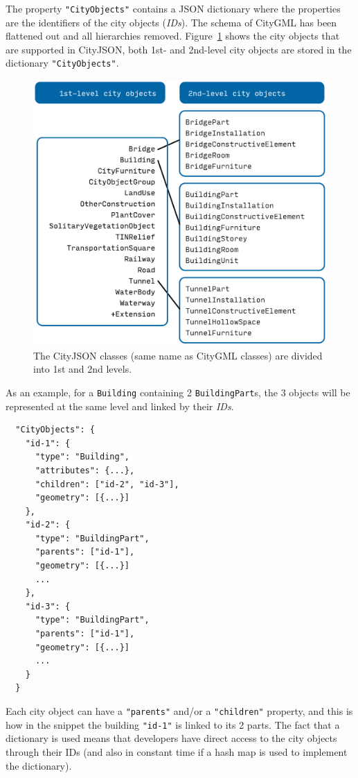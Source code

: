 The property \texttt{"CityObjects"} contains a JSON dictionary where the properties are the identifiers of the city objects (\emph{IDs}).
The schema of CityGML has been flattened out and all hierarchies removed.
Figure~\ref{fig:cityjson_co} shows the city objects that are supported in CityJSON, both 1st- and 2nd-level city objects are stored in the dictionary \texttt{"CityObjects"}.
\begin{figure}
  \centering
  \includegraphics[width=0.7\linewidth]{figs/cityjson_co}
  \caption[The CityJSON classes]{The CityJSON classes (same name as CityGML classes) are divided into 1st and 2nd levels.}%
\label{fig:cityjson_co}
\end{figure}

%

As an example, for a \texttt{Building} containing 2 \texttt{BuildingPart}s, the 3 objects will be represented at the same level and linked by their \emph{IDs}.
\begin{lstlisting}
  "CityObjects": {
    "id-1": {
      "type": "Building",
      "attributes": {...},
      "children": ["id-2", "id-3"],
      "geometry": [{...}]
    },
    "id-2": {
      "type": "BuildingPart",
      "parents": ["id-1"],
      "geometry": [{...}]
      ...
    },
    "id-3": {
      "type": "BuildingPart",
      "parents": ["id-1"],
      "geometry": [{...}]
      ...
    }
  }
\end{lstlisting}

%

Each city object can have a \texttt{"parents"} and/or a \texttt{"children"} property, and this is how in the snippet the building \texttt{"id-1"} is linked to its 2 parts.
The fact that a dictionary is used means that developers have direct access to the city objects through their IDs (and also in constant time if a hash map is used to implement the dictionary).

